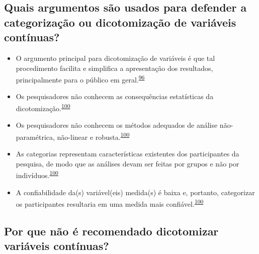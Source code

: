 \documentclass[
  a4paper,
]{book}
\begin{document}
\hypertarget{quais-argumentos-suxe3o-usados-para-defender-a-categorizauxe7uxe3o-ou-dicotomizauxe7uxe3o-de-variuxe1veis-contuxednuas}{%
\subsection{Quais argumentos são usados para defender a categorização ou dicotomização de variáveis contínuas?}\label{quais-argumentos-suxe3o-usados-para-defender-a-categorizauxe7uxe3o-ou-dicotomizauxe7uxe3o-de-variuxe1veis-contuxednuas}}

\begin{itemize}
\item
  O argumento principal para dicotomização de variáveis é que tal procedimento facilita e simplifica a apresentação dos resultados, principalmente para o público em geral.\textsuperscript{\protect\hyperlink{ref-Fedorov2009}{96}}
\item
  Os pesquisadores não conhecem as consequências estatísticas da dicotomização.\textsuperscript{\protect\hyperlink{ref-MacCallum2002}{100}}
\item
  Os pesquisadores não conhecem os métodos adequados de análise não-paramétrica, não-linear e robusta.\textsuperscript{\protect\hyperlink{ref-MacCallum2002}{100}}
\item
  As categorias representam características existentes dos participantes da pesquisa, de modo que as análises devam ser feitas por grupos e não por indivíduos.\textsuperscript{\protect\hyperlink{ref-MacCallum2002}{100}}
\item
  A confiabilidade da(s) variável(eis) medida(s) é baixa e, portanto, categorizar os participantes resultaria em uma medida mais confiável.\textsuperscript{\protect\hyperlink{ref-MacCallum2002}{100}}
\end{itemize}

\hypertarget{por-que-nuxe3o-uxe9-recomendado-dicotomizar-variuxe1veis-contuxednuas}{%
\subsection{Por que não é recomendado dicotomizar variáveis contínuas?}\label{por-que-nuxe3o-uxe9-recomendado-dicotomizar-variuxe1veis-contuxednuas}}
\end{document}
